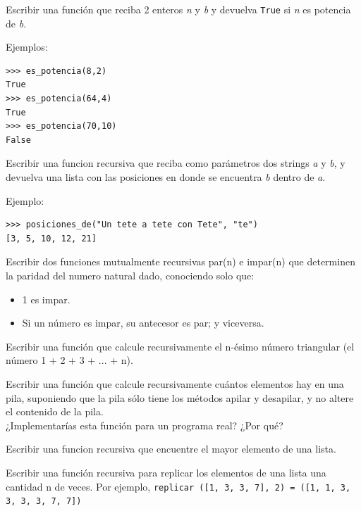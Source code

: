 \begin{ejercicio}
Escribir una función que reciba 2 enteros {\it n} y {\it b} y devuelva
\verb!True! si {\it n} es potencia de {\it b}.

Ejemplos:
\begin{verbatim}
>>> es_potencia(8,2)
True
>>> es_potencia(64,4)
True
>>> es_potencia(70,10)
False
\end{verbatim}
\end{ejercicio}

\begin{ejercicio}
Escribir una funcion recursiva que reciba como parámetros dos strings {\it a} y
{\it b}, y devuelva una lista con las posiciones en donde se encuentra {\it b}
dentro de {\it a}.

Ejemplo:
\begin{verbatim}
>>> posiciones_de("Un tete a tete con Tete", "te")
[3, 5, 10, 12, 21]
\end{verbatim}
\end{ejercicio}

\begin{ejercicio}
Escribir dos funciones mutualmente recursivas par(n) e impar(n) que
determinen la paridad del numero natural dado, conociendo solo que:
\begin{itemize}
    \item 1 es impar.
    \item Si un número es impar, su antecesor es par; y viceversa.
\end{itemize}
\end{ejercicio}

\begin{ejercicio}
Escribir una función que calcule recursivamente el n-ésimo número
triangular (el número 1 + 2 + 3 + ... + n).
\end{ejercicio}

\begin{ejercicio}
Escribir una función que calcule recursivamente cuántos elementos
hay en una pila, suponiendo que la pila sólo tiene los métodos apilar
y desapilar, y no altere el contenido de la pila.\\
¿Implementarías esta función para un programa real? ¿Por qué?
\end{ejercicio}

\begin{ejercicio}
Escribir una funcion recursiva que encuentre el mayor elemento de una lista.
\end{ejercicio}

\begin{ejercicio}
Escribir una función recursiva para replicar los elementos de una lista
una cantidad n de veces. Por ejemplo,
\verb!replicar ([1, 3, 3, 7], 2) = ([1, 1, 3, 3, 3, 3, 7, 7])!
\end{ejercicio}

